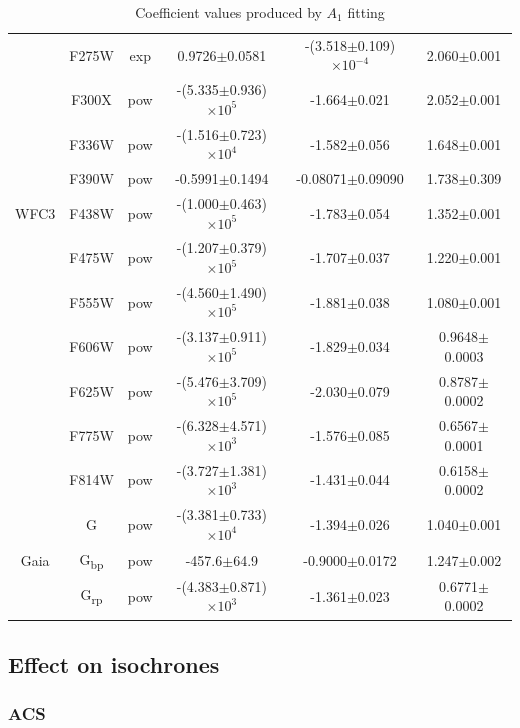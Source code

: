\documentclass[a4paper, 11pt, oneside]{LJMU_Astro_Thesis}  %
\begin{document}
\begin{table}
\begin{center}
\begin{tabular}{cccccc}
& F275W & exp & 0.9726$\pm$0.0581 & -(3.518$\pm$0.109)$\times 10^{-4}$ & 2.060$\pm$0.001 \\
& F300X & pow & -(5.335$\pm$0.936)$\times 10^{5}$ & -1.664$\pm$0.021 & 2.052$\pm$0.001 \\
& F336W & pow & -(1.516$\pm$0.723)$\times 10^{4}$ & -1.582$\pm$0.056 & 1.648$\pm$0.001 \\
& F390W & pow & -0.5991$\pm$0.1494 & -0.08071$\pm$0.09090 & 1.738$\pm$0.309 \\
WFC3 & F438W & pow & -(1.000$\pm$0.463)$\times 10^{5}$ & -1.783$\pm$0.054 & 1.352$\pm$0.001 \\
& F475W & pow & -(1.207$\pm$0.379)$\times 10^{5}$ & -1.707$\pm$0.037 & 1.220$\pm$0.001 \\
& F555W & pow & -(4.560$\pm$1.490)$\times 10^{5}$ & -1.881$\pm$0.038 & 1.080$\pm$0.001 \\
& F606W & pow & -(3.137$\pm$0.911)$\times 10^{5}$ & -1.829$\pm$0.034 & 0.9648$\pm$0.0003 \\
& F625W & pow & -(5.476$\pm$3.709)$\times 10^{5}$ & -2.030$\pm$0.079 & 0.8787$\pm$0.0002 \\
& F775W & pow & -(6.328$\pm$4.571)$\times 10^{3}$ & -1.576$\pm$0.085 & 0.6567$\pm$0.0001 \\
& F814W & pow & -(3.727$\pm$1.381)$\times 10^{3}$ & -1.431$\pm$0.044 & 0.6158$\pm$0.0002 \\ \hline

& G & pow & -(3.381$\pm$0.733)$\times 10^{4}$ & -1.394$\pm$0.026 & 1.040$\pm$0.001 \\
Gaia & G\textsubscript{bp} & pow & -457.6$\pm$64.9 & -0.9000$\pm$0.0172 & 1.247$\pm$0.002 \\
& G\textsubscript{rp} & pow & -(4.383$\pm$0.871)$\times 10^{3}$ & -1.361$\pm$0.023 & 0.6771$\pm$0.0002 \\ \hline

\end{tabular}
\caption{Coefficient values produced by $A_{1}$ fitting}
\label{simpfunc_coeffs_table}
\end{center}
\end{table}

\subsection{Effect on isochrones}
\subsubsection{ACS} \label{ACS_isoc}
\end{document}

